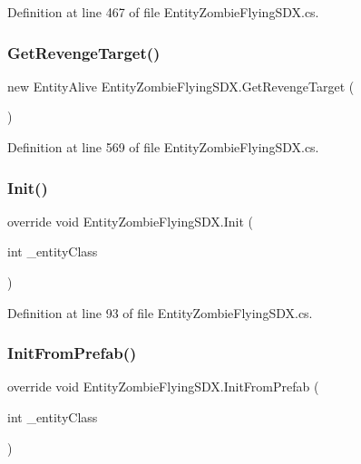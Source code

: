 Definition at line 467 of file Entity\+Zombie\+Flying\+S\+D\+X.\+cs.

\mbox{\label{class_entity_zombie_flying_s_d_x_ac68332812dcc95c878b586c5c5e01ccf}} 
\subsubsection{\texorpdfstring{GetRevengeTarget()}{GetRevengeTarget()}}
{\footnotesize\ttfamily new Entity\+Alive Entity\+Zombie\+Flying\+S\+D\+X.\+Get\+Revenge\+Target (\begin{DoxyParamCaption}{ }\end{DoxyParamCaption})}



Definition at line 569 of file Entity\+Zombie\+Flying\+S\+D\+X.\+cs.

\mbox{\label{class_entity_zombie_flying_s_d_x_a0e36bda6c13fed88c6d296455ed665b6}} 
\subsubsection{\texorpdfstring{Init()}{Init()}}
{\footnotesize\ttfamily override void Entity\+Zombie\+Flying\+S\+D\+X.\+Init (\begin{DoxyParamCaption}\item[{int}]{\+\_\+entity\+Class }\end{DoxyParamCaption})}



Definition at line 93 of file Entity\+Zombie\+Flying\+S\+D\+X.\+cs.

\mbox{\label{class_entity_zombie_flying_s_d_x_a0f99067e6f609d4aa155de8219633124}} 
\subsubsection{\texorpdfstring{InitFromPrefab()}{InitFromPrefab()}}
{\footnotesize\ttfamily override void Entity\+Zombie\+Flying\+S\+D\+X.\+Init\+From\+Prefab (\begin{DoxyParamCaption}\item[{int}]{\+\_\+entity\+Class }\end{DoxyParamCaption})}



